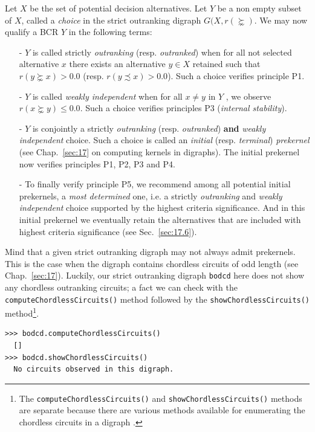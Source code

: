 Let $X$ be the set of potential decision alternatives. Let $Y$ be a non empty subset of $X$, called a \emph{choice} in the strict outranking digraph $G(X,r(\succnsim )$. We may now qualify a BCR $Y$ in the following terms:
\begin{itemize}[leftmargin=0.5cm,listparindent=0em]
\item [-] $Y$ is called strictly \emph{outranking} (resp. \emph{outranked}) when for all not selected alternative $x$ there exists an alternative $y \in X$ retained such that $r(y \succnsim x) > 0.0$ (resp. $r(y \precsim x) > 0.0$). Such a choice verifies principle P1.
\item [-] $Y$ is called \emph{weakly independent} when for all $x \neq y$ in $Y$ , we observe $r(x \succnsim y) \leq 0.0$. Such a choice verifies principles P3 (\emph{internal stability}).
\item [-] $Y$ is conjointly a strictly \emph{outranking} (resp. \emph{outranked}) \textbf{and} \emph{weakly independent} choice. Such a choice is called an \emph{initial} (resp. \emph{terminal}) \emph{prekernel} (see Chap.~\ref{sec:17} on computing kernels in digraphs). The initial prekernel now verifies principles P1, P2, P3 and P4. 
\item [-] To finally verify principle P5, we recommend among all potential initial prekernels, a \emph{most determined} one, i.e. a strictly \emph{outranking} and \emph{weakly independent} choice supported by the highest criteria significance. And in this initial prekernel we eventually retain the alternatives that are included with highest criteria significance (see Sec.~\ref{sec:17.6}).
\end{itemize}

Mind that a given strict outranking digraph may not always admit prekernels. This is the case when the digraph contains chordless circuits of odd length (see Chap.~\ref{sec:17}). Luckily, our strict outranking digraph \texttt{bodcd} here does not show any chordless outranking circuits; a fact we can check with the \texttt{computeChordless\-Cir\-cuits()} method followed by the \texttt{showChordlessCircuits()} method\footnote{The \texttt{computeChordlessCircuits()} and \texttt{showChordlessCircuits()} methods are separate because there are various methods available for enumerating the chordless circuits in a digraph \citep{BIS-2010}.}.
\begin{lstlisting}
>>> bodcd.computeChordlessCircuits()
  []  
>>> bodcd.showChordlessCircuits()
  No circuits observed in this digraph.
\end{lstlisting}

